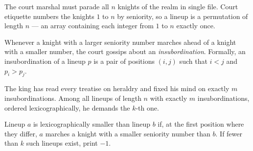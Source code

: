 The court marshal must parade all $n$ knights of the realm in single file. Court etiquette numbers the knights $1$ to $n$ by seniority, so a lineup is a permutation of length $n$ --- an array containing each integer from $1$ to $n$ exactly once.

Whenever a knight with a larger seniority number marches ahead of a knight with a smaller number, the court gossips about an \emph{insubordination}. Formally, an insubordination of a lineup $p$ is a pair of positions $(i,j)$ such that $i<j$ and $p_i>p_j$.

The king has read every treatise on heraldry and fixed his mind on exactly $m$ insubordinations. Among all lineups of length $n$ with exactly $m$ insubordinations, ordered lexicographically, he demands the $k$-th one.

Lineup $a$ is lexicographically smaller than lineup $b$ if, at the first position where they differ, $a$ marches a knight with a smaller seniority number than $b$.
If fewer than $k$ such lineups exist, print $-1$.
